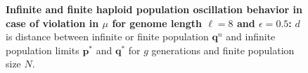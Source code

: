 \begin{figure}[H]
\begin{center}
\hspace{5pt}
\hspace{5pt}


\caption{\textbf{Infinite and finite haploid population oscillation behavior in case of violation in $\mu$ for genome length $\ell = 8$ and $\epsilon = 0.5$:} $d$ is
  distance between infinite or finite population ${\bm q}^n$ and infinite
  population limits ${{\bm p}^\ast}$ and ${{\bm q}^{\ast}}$ for $g$ generations and finite population size $N$.}
\label{oscillation_8h_vio_mu_0.5}
\end{center}
\end{figure}

